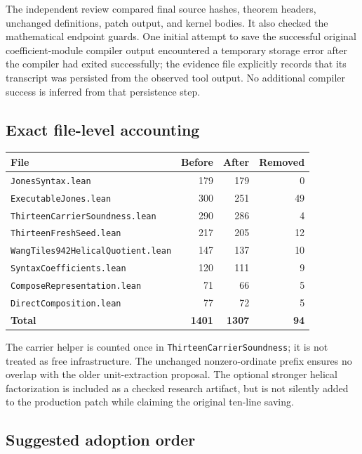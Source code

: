 \documentclass[11pt,letterpaper]{article}
\newcommand{\code}[1]{\nolinkurl{#1}}
\begin{document}
The independent review compared final source hashes, theorem headers, unchanged definitions, patch output, and kernel bodies. It also checked the mathematical endpoint guards. One initial attempt to save the successful original coefficient-module compiler output encountered a temporary storage error after the compiler had exited successfully; the evidence file explicitly records that its transcript was persisted from the observed tool output. No additional compiler success is inferred from that persistence step.

\subsection{Exact file-level accounting}

\begin{center}
\small
\begin{tabular}{@{}lrrr@{}}
\toprule
File & Before & After & Removed \\
\midrule
\code{JonesSyntax.lean} & 179 & 179 & 0 \\
\code{ExecutableJones.lean} & 300 & 251 & 49 \\
\code{ThirteenCarrierSoundness.lean} & 290 & 286 & 4 \\
\code{ThirteenFreshSeed.lean} & 217 & 205 & 12 \\
\code{WangTiles942HelicalQuotient.lean} & 147 & 137 & 10 \\
\code{SyntaxCoefficients.lean} & 120 & 111 & 9 \\
\code{ComposeRepresentation.lean} & 71 & 66 & 5 \\
\code{DirectComposition.lean} & 77 & 72 & 5 \\
\midrule
\textbf{Total} & \textbf{1401} & \textbf{1307} & \textbf{94} \\
\bottomrule
\end{tabular}
\end{center}

The carrier helper is counted once in \code{ThirteenCarrierSoundness}; it is not treated as free infrastructure. The unchanged nonzero-ordinate prefix ensures no overlap with the older unit-extraction proposal. The optional stronger helical factorization is included as a checked research artifact, but is not silently added to the production patch while claiming the original ten-line saving.

\subsection{Suggested adoption order}
\end{document}
